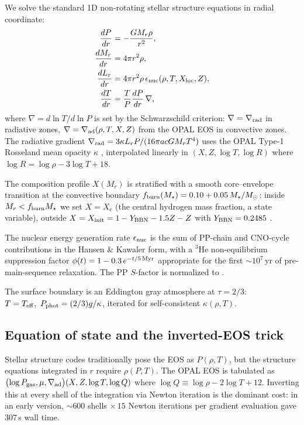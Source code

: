 \documentclass[twocolumn]{aastex631}
\newcommand{\Msun}{\ensuremath{M_\odot}}
\newcommand{\Teff}{\ensuremath{T_{\rm eff}}}
\begin{document}
We solve the standard 1D non-rotating stellar structure equations in
radial coordinate:
\begin{align}
\frac{dP}{dr}     &= -\frac{G M_r \rho}{r^2}, \\
\frac{dM_r}{dr}   &= 4\pi r^2 \rho, \\
\frac{dL_r}{dr}   &= 4\pi r^2 \rho \, \epsilon_{\rm nuc}(\rho, T, X_{\rm loc}, Z), \\
\frac{dT}{dr}     &= \frac{T}{P} \frac{dP}{dr} \, \nabla,
\end{align}
where $\nabla = d\ln T / d\ln P$ is set by the Schwarzschild criterion:
$\nabla = \nabla_{\rm rad}$ in radiative zones,
$\nabla = \nabla_{\rm ad}(\rho,T,X,Z)$ from the OPAL EOS in convective
zones. The radiative gradient
$\nabla_{\rm rad} = 3 \kappa L_r P / (16 \pi a c G M_r T^4)$
uses the OPAL Type-1 Rosseland mean opacity $\kappa$
\citep{1996ApJ...464..943I}, interpolated linearly in
$(X, Z, \log T, \log R)$ where $\log R = \log\rho - 3\log T + 18$.

The composition profile $X(M_r)$ is stratified with a smooth
core--envelope transition at the convective boundary
$f_{\rm burn}(M_\star) = 0.10 + 0.05\,M_\star/\Msun$:
inside $M_r < f_{\rm burn} M_\star$ we set $X = X_c$ (the central
hydrogen mass fraction, a state variable), outside $X = X_{\rm init} =
1 - Y_{\rm BBN} - 1.5 Z - Z$ with $Y_{\rm BBN} = 0.2485$
\citep{2015JCAP...07..011A}.

The nuclear energy generation rate $\epsilon_{\rm nuc}$ is the sum of
PP-chain and CNO-cycle contributions in the Hansen \& Kawaler
\citep{HansenKawaler1994} form, with a $^3$He non-equilibrium
suppression factor
$\phi(t) = 1 - 0.3\,e^{-t / 5\,{\rm Myr}}$
appropriate for the first $\sim 10^7$\,yr of pre-main-sequence
relaxation. The PP $S$-factor is normalized to
\citet{2011RvMP...83..195A}.

The surface boundary is an Eddington gray atmosphere at $\tau = 2/3$:
$T = \Teff,\ P_{\rm phot} = (2/3) g / \kappa$, iterated for self-consistent
$\kappa(\rho,T)$.

\subsection{Equation of state and the inverted-EOS trick}

Stellar structure codes traditionally pose the EOS as $P(\rho, T)$,
but the structure equations integrated in $r$ require $\rho(P, T)$. The
OPAL EOS is tabulated as
$\bigl(\log P_{\rm gas}, \mu, \nabla_{\rm ad}\bigr)
(X, Z, \log T, \log Q)$
where $\log Q \equiv \log\rho - 2\log T + 12$. Inverting this at every
shell of the integration via Newton iteration is the dominant cost: in
an early version, $\sim 600$ shells $\times\,15$ Newton iterations per
gradient evaluation gave $307\,$s wall time.
\end{document}
